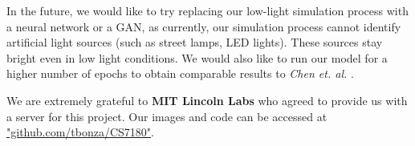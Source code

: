 \documentclass{article}
\begin{document}
In the future, we would like to try replacing our low-light simulation process with a neural network or a GAN, as currently, our simulation process cannot identify artificial light sources (such as street lamps, LED lights). These sources stay bright even in low light conditions. We would also like to run our model for a higher number of epochs to obtain comparable results to \textit{Chen et. al.} \cite{chen2018learning}. 

We are extremely grateful to \textbf{MIT Lincoln Labs} who agreed to provide us with a server for this project. Our images and code can be accessed at  \href{https://github.com/tbonza/CS7180}{"github.com/tbonza/CS7180"}.



\end{document}
